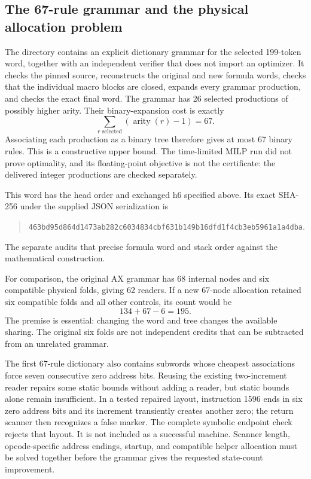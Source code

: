 \subsection{The 67-rule grammar and the physical allocation problem}
\label{sec:grammar67}

The directory  contains an explicit dictionary grammar
for the selected 199-token word, together with an independent verifier
that does not import an optimizer. It checks the pinned source, reconstructs
the original and new formula words, checks that the individual macro blocks
are closed, expands every grammar production, and checks the exact final
word. The grammar has 26 selected productions of possibly higher arity.
Their binary-expansion cost is exactly
\[
 \sum_{r\text{ selected}} (\operatorname{arity}(r)-1)=67.
\]
Associating each production as a binary tree therefore gives at most 67
binary rules. This is a constructive upper bound. The time-limited MILP
run did not prove optimality, and its floating-point objective is not the
certificate: the delivered integer productions are checked separately.

This word has the head order and exchanged h6 specified above. Its exact
SHA-256 under the supplied JSON serialization is
\begin{quote}\small
\nolinkurl{463bd95d864d1473ab282c6034834cbf631b149b16dfd1f4cb3eb5961a1a4dba}.
\end{quote}
The separate  audits that
precise formula word and stack order against the mathematical construction.

For comparison, the original AX grammar has 68 internal nodes and six
compatible physical folds, giving 62 readers. If a new 67-node allocation
retained six compatible folds and all other controls, its count would be
\[
 134+67-6=195.
\]
The premise is essential: changing the word and tree changes the available
sharing. The original six folds are not independent credits that can be
subtracted from an unrelated grammar.

The first 67-rule dictionary also contains subwords whose cheapest
associations force seven consecutive zero address bits. Reusing the
existing two-increment reader repairs some static bounds without adding a
reader, but static bounds alone remain insufficient. In a tested repaired
layout, instruction 1596 ends in six zero address bits and its increment
transiently creates another zero; the return scanner then recognizes a
false marker. The complete symbolic endpoint check rejects that layout.
It is not included as a successful machine. Scanner length, opcode-specific
address endings, startup, and compatible helper allocation must be solved
together before the grammar gives the requested state-count improvement.
